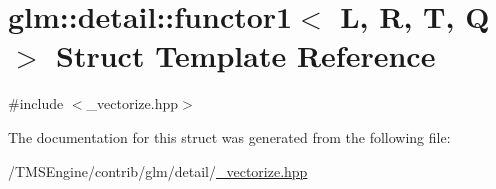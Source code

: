 \hypertarget{structglm_1_1detail_1_1functor1}{}\section{glm\+:\+:detail\+:\+:functor1$<$ L, R, T, Q $>$ Struct Template Reference}
\label{structglm_1_1detail_1_1functor1}


{\ttfamily \#include $<$\+\_\+vectorize.\+hpp$>$}



The documentation for this struct was generated from the following file\+:\begin{DoxyCompactItemize}
\item 
/\+T\+M\+S\+Engine/contrib/glm/detail/\hyperlink{__vectorize_8hpp}{\+\_\+vectorize.\+hpp}\end{DoxyCompactItemize}
